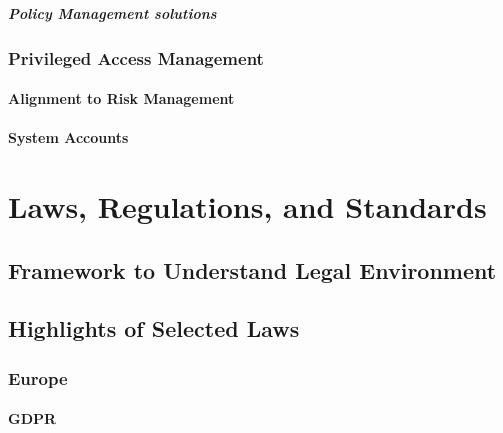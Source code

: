 \hypertarget{policy-management-solutions}{%
\paragraph{Policy Management
solutions}\label{policy-management-solutions}}

\hypertarget{privileged-access-management}{%
\subsection{Privileged Access
Management}\label{privileged-access-management}}

\hypertarget{alignment-to-risk-management}{%
\subsubsection{Alignment to Risk
Management}\label{alignment-to-risk-management}}

\hypertarget{system-accounts}{%
\subsubsection{System Accounts}\label{system-accounts}}

\hypertarget{laws-regulations-and-standards}{%
\chapter{Laws, Regulations, and
Standards}\label{laws-regulations-and-standards}}

\hypertarget{framework-to-understand-legal-environment}{%
\section{Framework to Understand Legal
Environment}\label{framework-to-understand-legal-environment}}

\hypertarget{highlights-of-selected-laws}{%
\section{Highlights of Selected
Laws}\label{highlights-of-selected-laws}}

\hypertarget{europe}{%
\subsection{Europe}\label{europe}}

\hypertarget{gdpr}{%
\subsubsection{GDPR}\label{gdpr}}

